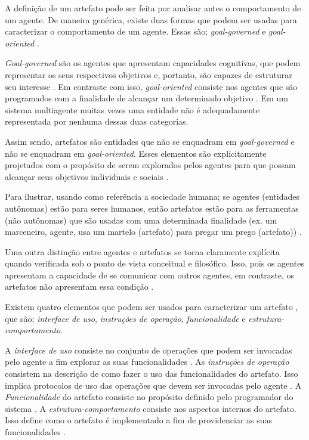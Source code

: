 A definição de um artefato pode ser feita por analisar antes o comportamento de um agente. De maneira genérica, existe duas formas que podem ser usadas para caracterizar o comportamento de um agente. Essas são; \textit{goal-governed} e \textit{goal-oriented} \cite{relationwithagentprogram} \cite{programingagentartefact}.

\textit{Goal-governed} são os agentes que apresentam capacidades cognitivas, que podem representar os seus respectivos objetivos e, portanto, são capazes de estruturar seu interesse \cite{relationwithagentprogram} \cite{programingagentartefact}. Em contraste com isso, \textit{goal-oriented} consiste nos agentes que são programados com a finalidade de alcançar um determinado objetivo \cite{relationwithagentprogram} \cite{programingagentartefact}. Em um sistema multiagente muitas vezes
uma entidade não é adequadamente representada por nenhuma dessas duas categorias. 

Assim sendo, artefatos são entidades que não se enquadram em  \textit{goal-governed} e não se enquadram em \textit{goal-oriented}. Esses elementos são explicitamente projetados com o propósito de serem explorados pelos agentes para que possam alcançar seus objetivos individuais e sociais \cite{programingagentartefact} \cite{cartago}. 

Para ilustrar, usando como referência a sociedade humana; se agentes (entidades autônomas) estão para seres humanos, então artefatos estão para as ferramentas (não autônomas) que são usadas com uma determinada finalidade (ex. um marceneiro, agente, usa um martelo (artefato) para pregar um prego (artefato)) \cite{programingagentartefact}.

Uma outra distinção entre agentes e artefatos se torna claramente explícita quando verificada sob o ponto de vista conceitual e filosófico. Isso, pois os agentes apresentam a capacidade de se comunicar com outros agentes, em contraste, os artefatos não apresentam essa condição \cite{programingagentartefact}.

Existem quatro elementos que podem ser usados para caracterizar um artefato \cite{programingagentartefact}, que são; \textit{interface de uso}, \textit{instruções de operação}, \textit{funcionalidade} e \textit{estrutura-comportamento}.

A \textit{interface de uso} consiste no conjunto de operações que podem ser invocadas pelo agente a fim explorar as suas funcionalidades \cite{programingagentartefact}. As \textit{instruções de operação} consistem na descrição de como fazer o uso das funcionalidades do artefato. Isso implica protocolos de uso das operações que devem ser invocadas pelo agente \cite{programingagentartefact}. A \textit{Funcionalidade} do artefato consiste no propósito definido pelo programador do sistema \cite{programingagentartefact}. A \textit{estrutura-comportamento} consiste nos aspectos internos do artefato. Isso define como o artefato é implementado a fim de providenciar as suas funcionalidades \cite{programingagentartefact}.    

